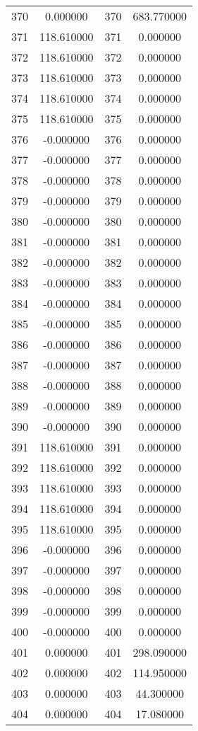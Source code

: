 \documentclass[12pt]{article}
\begin{document}
\begin{longtable}{@{}cccc@{}}
370 & 0.000000 & 370 & 683.770000 \\
371 & 118.610000 & 371 & 0.000000 \\
372 & 118.610000 & 372 & 0.000000 \\
373 & 118.610000 & 373 & 0.000000 \\
374 & 118.610000 & 374 & 0.000000 \\
375 & 118.610000 & 375 & 0.000000 \\
376 & -0.000000 & 376 & 0.000000 \\
377 & -0.000000 & 377 & 0.000000 \\
378 & -0.000000 & 378 & 0.000000 \\
379 & -0.000000 & 379 & 0.000000 \\
380 & -0.000000 & 380 & 0.000000 \\
381 & -0.000000 & 381 & 0.000000 \\
382 & -0.000000 & 382 & 0.000000 \\
383 & -0.000000 & 383 & 0.000000 \\
384 & -0.000000 & 384 & 0.000000 \\
385 & -0.000000 & 385 & 0.000000 \\
386 & -0.000000 & 386 & 0.000000 \\
387 & -0.000000 & 387 & 0.000000 \\
388 & -0.000000 & 388 & 0.000000 \\
389 & -0.000000 & 389 & 0.000000 \\
390 & -0.000000 & 390 & 0.000000 \\
391 & 118.610000 & 391 & 0.000000 \\
392 & 118.610000 & 392 & 0.000000 \\
393 & 118.610000 & 393 & 0.000000 \\
394 & 118.610000 & 394 & 0.000000 \\
395 & 118.610000 & 395 & 0.000000 \\
396 & -0.000000 & 396 & 0.000000 \\
397 & -0.000000 & 397 & 0.000000 \\
398 & -0.000000 & 398 & 0.000000 \\
399 & -0.000000 & 399 & 0.000000 \\
400 & -0.000000 & 400 & 0.000000 \\
401 & 0.000000 & 401 & 298.090000 \\
402 & 0.000000 & 402 & 114.950000 \\
403 & 0.000000 & 403 & 44.300000 \\
404 & 0.000000 & 404 & 17.080000 \\

\end{longtable}
\end{document}
